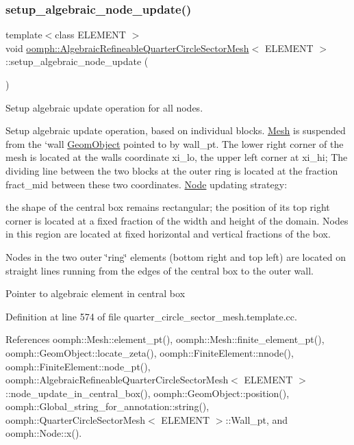 \subsubsection{\texorpdfstring{setup\+\_\+algebraic\+\_\+node\+\_\+update()}{setup\_algebraic\_node\_update()}}
{\footnotesize\ttfamily template$<$class E\+L\+E\+M\+E\+NT $>$ \\
void \hyperlink{classoomph_1_1AlgebraicRefineableQuarterCircleSectorMesh}{oomph\+::\+Algebraic\+Refineable\+Quarter\+Circle\+Sector\+Mesh}$<$ E\+L\+E\+M\+E\+NT $>$\+::setup\+\_\+algebraic\+\_\+node\+\_\+update (\begin{DoxyParamCaption}{ }\end{DoxyParamCaption})\hspace{0.3cm}{\ttfamily [private]}}



Setup algebraic update operation for all nodes. 

Setup algebraic update operation, based on individual blocks. \hyperlink{classoomph_1_1Mesh}{Mesh} is suspended from the `wall\textquotesingle{} \hyperlink{classoomph_1_1GeomObject}{Geom\+Object} pointed to by wall\+\_\+pt. The lower right corner of the mesh is located at the wall\textquotesingle{}s coordinate xi\+\_\+lo, the upper left corner at xi\+\_\+hi; The dividing line between the two blocks at the outer ring is located at the fraction fract\+\_\+mid between these two coordinates. \hyperlink{classoomph_1_1Node}{Node} updating strategy\+:
\begin{DoxyItemize}
\item the shape of the central box remains rectangular; the position of its top right corner is located at a fixed fraction of the width and height of the domain. Nodes in this region are located at fixed horizontal and vertical fractions of the box.
\item Nodes in the two outer \char`\"{}ring\char`\"{} elements (bottom right and top left) are located on straight lines running from the edges of the central box to the outer wall. 
\end{DoxyItemize}Pointer to algebraic element in central box 

Definition at line 574 of file quarter\+\_\+circle\+\_\+sector\+\_\+mesh.\+template.\+cc.



References oomph\+::\+Mesh\+::element\+\_\+pt(), oomph\+::\+Mesh\+::finite\+\_\+element\+\_\+pt(), oomph\+::\+Geom\+Object\+::locate\+\_\+zeta(), oomph\+::\+Finite\+Element\+::nnode(), oomph\+::\+Finite\+Element\+::node\+\_\+pt(), oomph\+::\+Algebraic\+Refineable\+Quarter\+Circle\+Sector\+Mesh$<$ E\+L\+E\+M\+E\+N\+T $>$\+::node\+\_\+update\+\_\+in\+\_\+central\+\_\+box(), oomph\+::\+Geom\+Object\+::position(), oomph\+::\+Global\+\_\+string\+\_\+for\+\_\+annotation\+::string(), oomph\+::\+Quarter\+Circle\+Sector\+Mesh$<$ E\+L\+E\+M\+E\+N\+T $>$\+::\+Wall\+\_\+pt, and oomph\+::\+Node\+::x().



